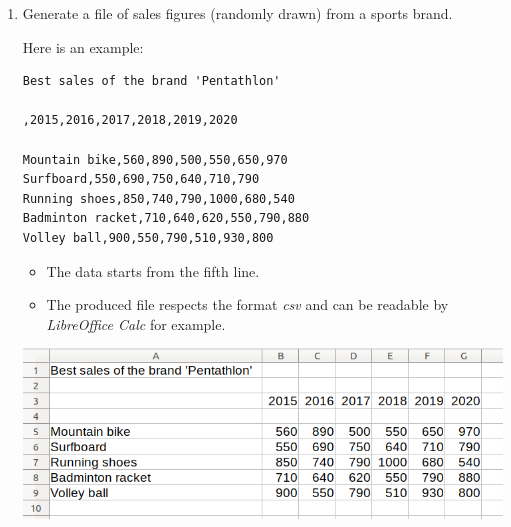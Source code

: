 \documentclass[11pt,class=report,crop=false]{standalone}
\begin{document}



\begin{activite}


\begin{enumerate}
  \item Generate a  file of sales figures (randomly drawn) from a sports brand.
  
Here is an example:
\begin{center}
\begin{minipage}{0.4\textwidth}
\begin{lstlisting}
Best sales of the brand 'Pentathlon'

,2015,2016,2017,2018,2019,2020

Mountain bike,560,890,500,550,650,970
Surfboard,550,690,750,640,710,790
Running shoes,850,740,790,1000,680,540
Badminton racket,710,640,620,550,790,880
Volley ball,900,550,790,510,930,800
\end{lstlisting}
\end{minipage}
\end{center}

\begin{itemize}
  \item The data starts from the fifth line.
  \item The produced file respects the format \emph{csv} and can be readable by
   \emph{LibreOffice Calc} for example.
\end{itemize}

\begin{center}
\includegraphics[scale=\myscale,scale=0.45]{screen-files-2b-en}
\end{center} 


\end{enumerate}
\end{activite}
\end{document}
